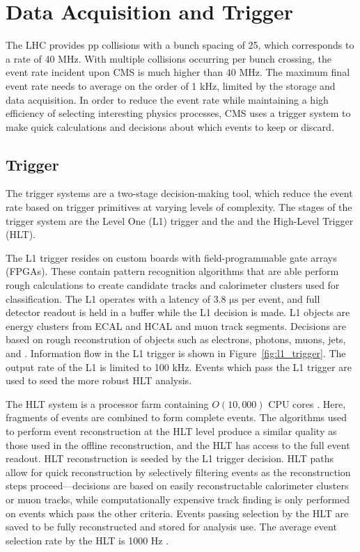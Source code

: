 \section{Data Acquisition and Trigger}
The LHC provides pp collisions with a bunch spacing of 25\ns, which corresponds to a rate of 40 MHz. With multiple collisions occurring per bunch crossing, the event rate incident upon CMS is much higher than 40 MHz. The maximum final event rate needs to average on the order of 1 kHz, limited by the storage and data acquisition. In order to reduce the event rate while maintaining a high efficiency of selecting interesting physics processes, CMS uses a trigger system to make quick calculations and decisions about which events to keep or discard. 

\subsection{Trigger}
The trigger systems are a two-stage decision-making tool, which reduce the event rate based on trigger primitives at varying levels of complexity. The stages of the trigger system are the Level One (L1) trigger and the and the High-Level Trigger (HLT)\cite{Khachatryan:2016bia}. 

The L1 trigger resides on custom boards with field-programmable gate arrays (FPGAs). These contain pattern recognition algorithms that are able perform rough calculations to create candidate tracks and calorimeter clusters used for classification. The L1 operates with a latency of 3.8 $\mathrm{\mu s}$ per event, and full detector readout is held in a buffer while the L1 decision is made. L1 objects are energy clusters from ECAL and HCAL and muon track segments. Decisions are based on rough reconstrution of objects such as electrons, photons, muons, jets, and \met.  Information flow in the L1 trigger is shown in Figure~\ref{fig:l1_trigger}. The output rate of the L1 is limited to 100 kHz. Events which pass the L1 trigger are used to seed the more robust HLT analysis\cite{Khachatryan:2016bia}. 



The HLT system is a processor farm containing $O(10,000)$ CPU cores \cite{Adam:2005zf}. Here, fragments of events are combined to form complete events. The algorithms used to perform event reconstruction at the HLT level produce a similar quality as those used in the offline reconstruction, and the HLT has access to the full event readout. HLT reconstruction is seeded by the L1 trigger decision. HLT paths allow for quick reconstruction by selectively filtering events as the reconstruction steps proceed---decisions are based on easily reconstructable calorimeter clusters or muon tracks, while computationally expensive track finding is only performed on events which pass the other criteria. Events passing selection by the HLT are saved to be fully reconstructed and stored for analysis use. The average event selection rate by the HLT is 1000 Hz \cite{Khachatryan:2016bia}. 

